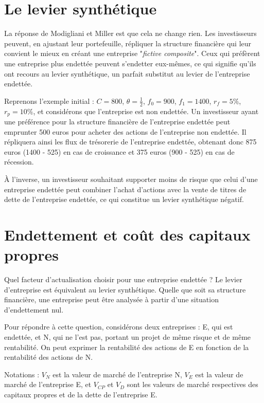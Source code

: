 \documentclass[a4paper, 12pt]{report}
\begin{document}
\section{Le levier synthétique}

La réponse de Modigliani et Miller est que cela ne change rien. Les investisseurs peuvent, en ajustant leur portefeuille, répliquer la structure financière qui leur convient le mieux en créant une entreprise "\textit{fictive composite}". Ceux qui préfèrent une entreprise plus endettée peuvent s'endetter eux-mêmes, ce qui signifie qu'ils ont recours au levier synthétique, un parfait substitut au levier de l'entreprise endettée.

Reprenons l'exemple initial : \( C = 800 \), \( \theta = \frac{1}{2} \), \( f_0 = 900 \), \( f_1 = 1400 \), \( r_f = 5\% \), \( r_p = 10\% \), et considérons que l'entreprise est non endettée. Un investisseur ayant une préférence pour la structure financière de l'entreprise endettée peut emprunter 500 euros pour acheter des actions de l'entreprise non endettée. Il répliquera ainsi les flux de trésorerie de l'entreprise endettée, obtenant donc 875 euros (1400 - 525) en cas de croissance et 375 euros (900 - 525) en cas de récession. 

À l'inverse, un investisseur souhaitant supporter moins de risque que celui d'une entreprise endettée peut combiner l'achat d'actions avec la vente de titres de dette de l'entreprise endettée, ce qui constitue un levier synthétique négatif.

\section{Endettement et coût des capitaux propres}

Quel facteur d'actualisation choisir pour une entreprise endettée ? Le levier d'entreprise est équivalent au levier synthétique. Quelle que soit sa structure financière, une entreprise peut être analysée à partir d'une situation d'endettement nul. 

Pour répondre à cette question, considérons deux entreprises : E, qui est endettée, et N, qui ne l'est pas, portant un projet de même risque et de même rentabilité. On peut exprimer la rentabilité des actions de E en fonction de la rentabilité des actions de N. 

Notations : \( V_N \) est la valeur de marché de l'entreprise N, \( V_E \) est la valeur de marché de l'entreprise E, et \( V_{CP} \) et \( V_D \) sont les valeurs de marché respectives des capitaux propres et de la dette de l'entreprise E. 
\end{document}

